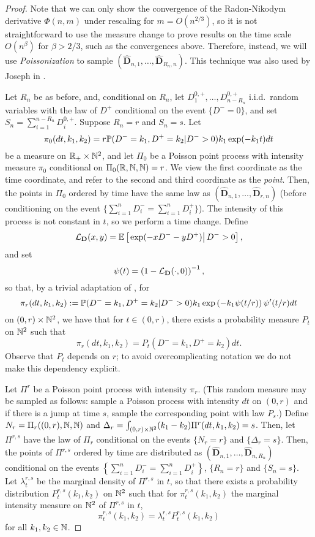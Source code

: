 \begin{proof}
Note that we can only show the convergence of the Radon-Nikodym derivative $\Phi(n,m)$ under rescaling for $m=O(n^{2/3})$, so it is not straightforward to use the measure change to prove results on the time scale $O(n^\beta)$ for $\beta>2/3$, such as the convergences above. Therefore, instead, we will use \emph{Poissonization} to sample $(\mathbf{\hat{D}}_{n,1},\dots,\mathbf{\hat{D}}_{R_n,n})$. This technique was also used by Joseph in \cite{josephComponentSizesCritical2014}. 

 Let $R_n$ be as before, and, conditional on $R_n$, let $D^{0,+}_1,\dots,D^{0,+}_{n-R_n}$ i.i.d.\ random variables with the law of $D^+$ conditional on the event $\{D^-=0\}$, and set $S_n=\sum_{i=1}^{n-R_n}D^{0,+}_i$. Suppose $R_n=r$ and $S_n=s$. 
Let
$$\pi_0(dt,k_1,k_2)=r\P(D^-=k_1,D^+=k_2|D^->0)k_1\exp(-k_1 t)dt$$
be a measure on $\R_+\times \N^2$, and let $\Pi_0$ be a Poisson point process with intensity measure $\pi_0$ conditional on $\Pi_0(\R,\N,\N)=r$. We view the first coordinate as the time coordinate, and refer to the second and third coordinate as the \emph{point}. Then, the points in $\Pi_0$ ordered by time have the same law as $(\mathbf{\hat{D}}_{n,1},\dots,\mathbf{\hat{D}}_{r,n})$ (before conditioning on the event $\{\sum_{i=1}^nD^-_i=\sum_{i=1}^nD^+_i\}$).  
The intensity of this process is not constant in $t$, so we perform a time change. Define
$$\cL_{\mathbf{D}}(x,y)=\E\left[\left.\exp(-xD^--yD^+)\right|D^->0 \right],$$
and set 
$$\psi(t)=\left(1-\cL_{\mathbf{D}}(\cdot,0)\right)^{-1},$$
so that, by a trivial adaptation of \cite[Lemma 4.1]{josephComponentSizesCritical2014}, for 
$$\pi_r(dt,k_1,k_2):=\P(D^-=k_1,D^+=k_2|D^->0)k_1\exp\left(-k_1 \psi(t/r)\right)\psi'(t/r)dt$$
on $(0,r)\times \N^2$, we have that for $t\in (0,r)$, there exists a probability measure $P_t$ on $\N^2$ such that
$$\pi_r(dt,k_1,k_2)=P_t(D^-=k_1,D^+=k_2)dt.$$
Observe that $P_t$ depends on $r$; to avoid overcomplicating notation we do not make this dependency explicit.

Let ${\Pi}^r$ be a Poisson point process with intensity $\pi_r$. (This random measure may be sampled as follows: sample a Poisson process with intensity $dt$ on $(0,r)$ and if there is a jump at time $s$, sample the corresponding point with law $P_s$.)  Define $N_r= {\Pi}_r((0,r),\N,\N)$ and $\Delta_r=\int_{(0,r)\times \N^2}(k_1-k_2){\Pi}^r(dt,k_1,k_2)=s$. Then, let ${\Pi}^{r,s}$ have the law of ${\Pi}_r$ conditional on the events $\{N_r=r\}$ and $\{\Delta_r=s\}$. Then, the points of ${\Pi}^{r,s}$ ordered by time are distributed as $(\mathbf{\hat{D}}_{n,1},\dots,\mathbf{\hat{D}}_{n,R_n})$ conditional on the events $\left\{\sum_{i=1}^nD^-_i=\sum_{i=1}^nD^+_i\right\}$, $\{R_n=r\}$ and $\{S_n=s\}$. Let ${\lambda}^{r,s}_t$ be the marginal density of ${\Pi}^{r,s}$ in $t$, so that there exists a probability distribution ${P}^{r,s}_t(k_1,k_2)$ on $\N^2$ such that for ${\pi}^{r,s}_t(k_1,k_2)$ the marginal intensity measure on $\N^2$ of ${\Pi}^{r,s}$ in $t$, 
$${\pi}^{r,s}_t(k_1,k_2)={\lambda}^{r,s}_t{P}^{r,s}_t(k_1,k_2)$$
for all $k_1,k_2\in \N$.


\end{proof}
